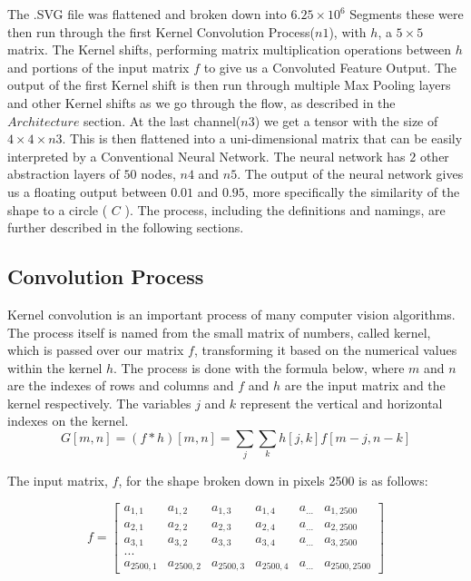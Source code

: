 \documentclass[9pt,onecolumn,oneside]{osajnl}
\begin{document}
	 The .SVG file was flattened and broken down into \(6.25 \times  10^{6}\) Segments these were then run through the first Kernel Convolution Process(\(n1\)), with \(h\), a \(5\times5\) matrix. The Kernel shifts, performing matrix multiplication operations between \( h\) and portions of the input matrix \(f\) to give us a Convoluted Feature Output. The output of the first Kernel shift is then run through multiple Max Pooling layers and other Kernel shifts as we go through the flow, as described in the \(Architecture\) section. At the last channel(\(n3\)) we get a tensor with the size of \(4 \times 4 \times n3\). This is then flattened into a uni-dimensional matrix that can be easily interpreted by a Conventional Neural Network. The neural network has \(2\) other abstraction layers of \(50\) nodes, \(n4\) and \(n5\). The output of the neural network gives us a floating output between \(0.01\) and \(0.95\), more specifically the similarity of the shape to a circle ( \(C\) ). The process, including the definitions and namings, are further described in the following sections.
 
\subsection{Convolution Process}

	Kernel convolution is an important process of many computer vision algorithms. The process itself is named from the small matrix of numbers, called kernel, which is passed over our matrix \(f\), transforming it based on the numerical values within the kernel \(h\). The process is done with the formula below, where \(m\) and \(n\) are the indexes of rows and columns and \(f\) and \(h\) are the input matrix and the kernel respectively. The variables \(j\) and \(k\) represent the vertical and horizontal indexes on the kernel.
 \[G[m, n] = (f * h)[m, n] = \sum_{j}\sum_{k}h[j,k]f[m - j, n - k]\]



 The input matrix, \(f\), for the shape broken down in pixels 2500  is as follows:
 


\[
f =\begin{bmatrix}
a_{1,1} & a_{1,2} & a_{1,3} & a_{1,4} & a_{...} & a_{1,2500}\\
a_{2,1} & a_{2,2} & a_{2,3} & a_{2,4} & a_{...} & a_{2,2500}\\
a_{3,1} & a_{3,2} & a_{3,3} & a_{3,4} & a_{...} & a_{3,2500}\\
...\\
a_{2500,1} & a_{2500,2} & a_{2500,3} & a_{2500,4} & a_{...} & a_{2500,2500}
\end{bmatrix} \]
\end{document}
